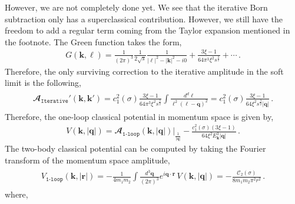 However, we are not completely done yet. We see that the iterative Born subtraction only has a superclassical contribution. However, we still have the freedom to add a regular term coming from the Taylor expansion mentioned in the footnote. The Green function takes the form,
\begin{align}
    G(\boldsymbol{k},\boldsymbol{\ell})=\frac{1}{(2\pi)^3}\frac{1}{2\sqrt{s}}\frac{1}{|\boldsymbol{\ell}|^2-|\boldsymbol{k}|^2-i0}+\frac{3\xi-1}{64 \pi^3 \xi^2 {s^{\frac{3}{2}}}}+\cdots\,.
\end{align}
Therefore, the only surviving correction to the iterative amplitude in the soft limit is the following,
\begin{align}
    \begin{split}
        \mathbfcal{A}_{\texttt{Iterative}}'(\boldsymbol{k},\boldsymbol{k'})=c_1^2(\sigma)\frac{3\xi-1}{64\pi^3\xi^2s^{\frac{3}{2}}}\int \frac{d^d\boldsymbol{\ell}}{\boldsymbol{\ell}^2(\boldsymbol{\ell}-\boldsymbol{q})^2}=c_1^2(\sigma)\frac{3\xi-1}{64\xi^2s^{\frac{3}{2}}|\boldsymbol{q}|}\,.
    \end{split}
\end{align}
Therefore, the one-loop classical potential in momentum space is given by,
\begin{align}
V(\boldsymbol{k},|\boldsymbol{q}|)=\mathbfcal{A}_{\texttt{1-loop}}(\boldsymbol{k},|\boldsymbol{q}|)\Big|_{\frac{1}{|\boldsymbol{q}|}}-\frac{c_1^2(\sigma)(3\xi-1)}{64\xi^2 E_{\boldsymbol{k}}^3 |\boldsymbol{q}| }\,.
\end{align}
The two-body classical  potential can be computed by taking the Fourier transform of the momentum space amplitude,
\begin{align}   
\begin{split}
V_{\texttt{1-loop}}(\boldsymbol{k},|\boldsymbol{r}|)=-\frac{1}{
4m_1m_2}\int \frac{d^3\boldsymbol{q}}{(2\pi)^3}e^{i\boldsymbol{q}\cdot \boldsymbol{r}}\,V(\boldsymbol{k},|\boldsymbol{q}|) =-\frac{\mathcal{C}_2(\sigma)}{8m_1m_2\pi^2 r^2}\,.
\end{split}
\end{align}
where,
